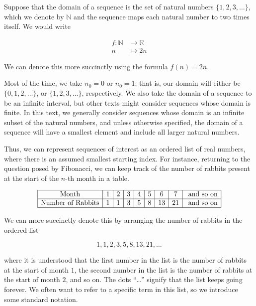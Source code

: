 \documentclass{ximera}
\begin{document}
\begin{example}
Suppose that the domain of a sequence is the set of natural numbers $\{1,2,3,\ldots\}$, which we denote by $\mathbb N$ and the sequence maps each natural number to two times itself.  We would write

\begin{align*}
f : \mathbb N & \to \mathbb R \\
    n &\mapsto 2n
\end{align*}

We can denote this more succinctly using the formula $f(n)=2n$.
\end{example}

Most of the time, we take $n_0=0$ or $n_0=1$; that is, our domain will either be $\{0,1,2,\ldots\}$, or $\{1,2,3,\ldots\}$, respectively.  We also take the domain of a sequence to be an infinite interval, but other texts might consider sequences whose domain is finite. In this text, we generally consider sequences whose domain is an infinite subset of the natural numbers, and unless otherwise specified, the domain of a sequence will have a smallest element and include all larger natural numbers.

Thus, we can represent sequences of interest as an ordered list of real numbers, where there is an assumed smallest starting index.  For instance, returning to the question posed by Fibonacci, we can keep track of the number of rabbits present at the start of the $n$-th month in a table.

\[
\begin{array}{| c | c | c | c | c | c| c| c| c| }
\hline
\textrm{Month} & 1 & 2 & 3 & 4 & 5 & 6 & 7 & \textrm{ and so on} \\
\hline
\textrm{Number of Rabbits} & 1 & 1 & 3 & 5 & 8 &13 &21 & \textrm{ and so on} \\
\hline
\end{array}
\]

We can more succinctly denote this by arranging the number of rabbits in the ordered list


\[
1,1,2,3,5,8,13,21, \ldots 
\]

where it is understood that the first number in the list is the number of rabbits at the start of month $1$, the second number in the list is the number of rabbits at the start of month $2$, and so on.  The dots ``\ldots'' signify that the list keeps going forever.  We often want to refer to a specific term in this list, so we introduce some standard notation.
\end{document}
